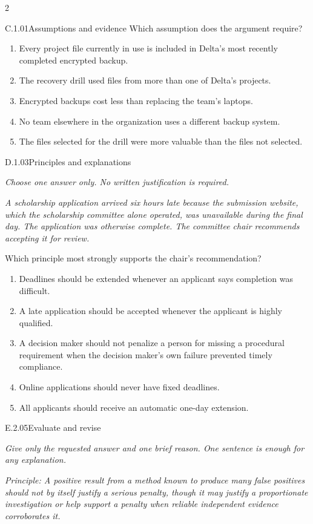 \documentclass[9pt]{extarticle}
\newcommand{\choice}[1]{\item #1}
\begin{document}
\begin{multicols}{2}
\begin{DenseCoreProblem}{C.1.01}{Assumptions and evidence}
Which assumption does the argument require?
\begin{enumerate}[label=(\alph*)]
  \choice{Every project file currently in use is included in Delta's most recently completed encrypted backup.}
  \choice{The recovery drill used files from more than one of Delta's projects.}
  \choice{Encrypted backups cost less than replacing the team's laptops.}
  \choice{No team elsewhere in the organization uses a different backup system.}
  \choice{The files selected for the drill were more valuable than the files not selected.}
\end{enumerate}
\end{DenseCoreProblem}
\begin{DenseCoreProblem}{D.1.03}{Principles and explanations}
{\scriptsize\textit{Choose one answer only. No written justification is required.}\par}
\emph{A scholarship application arrived six hours late because the submission website, which the scholarship committee alone operated, was unavailable during the final day. The application was otherwise complete. The committee chair recommends accepting it for review.}

Which principle most strongly supports the chair's recommendation?
\begin{enumerate}[label=(\alph*)]
  \choice{Deadlines should be extended whenever an applicant says completion was difficult.}
  \choice{A late application should be accepted whenever the applicant is highly qualified.}
  \choice{A decision maker should not penalize a person for missing a procedural requirement when the decision maker's own failure prevented timely compliance.}
  \choice{Online applications should never have fixed deadlines.}
  \choice{All applicants should receive an automatic one-day extension.}
\end{enumerate}
\end{DenseCoreProblem}
\begin{DenseCoreProblem}{E.2.05}{Evaluate and revise}
{\scriptsize\textit{Give only the requested answer and one brief reason. One sentence is enough for any explanation.}\par}
\emph{Principle: A positive result from a method known to produce many false positives should not by itself justify a serious penalty, though it may justify a proportionate investigation or help support a penalty when reliable independent evidence corroborates it.}


\end{DenseCoreProblem}
\end{multicols}
\end{document}
